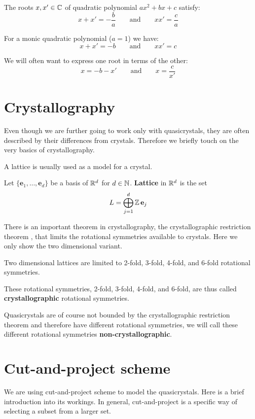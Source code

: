 \documentclass[text.tex]{subfiles}
\begin{document}
The roots $x,x'\in\mathbb{C}$ of quadratic polynomial $ax^2+bx+c$ satisfy: 
$$x+x'=-\frac{b}{a}\qquad\text{and}\qquad xx'=\frac{c}{a}$$

For a monic quadratic polynomial ($a=1$) we have:
$$x+x'=-b\qquad\text{and}\qquad xx'=c$$

We will often want to express one root in terms of the other: 
$$x=-b-x'\qquad\text{and}\qquad x=\frac{c}{x'}$$


\section{Crystallography}\label{sec_crystallography}%
Even though we are further going to work only with quasicrystals, they are often described by their differences from crystals. Therefore we briefly touch on the very basics of crystallography. 

A lattice is usually used as a model for a crystal. 

\begin{definition}
Let $\{\mathbf{e}_1, \dots, \mathbf{e}_d\}$ be a basis of $\mathbb{R}^d$ for $d\in\mathbb{N}$. \textbf{Lattice} in $\mathbb{R}^d$ is the set
$$L = \bigoplus^d_{j=1}\mathbb{Z}\, \mathbf{e}_j$$
\end{definition}

There is an important theorem in crystallography, the crystallographic restriction theorem \cite{restriction}, that limits the rotational symmetries available to crystals. Here we only show the two dimensional variant. 

\begin{theorem}
Two dimensional lattices are limited to 2-fold, 3-fold, 4-fold, and 6-fold rotational symmetries. 
\end{theorem}

These rotational symmetries, 2-fold, 3-fold, 4-fold, and 6-fold, are thus called \textbf{crystallographic} rotational symmetries. 

Quasicrystals are of course not bounded by the crystallographic restriction theorem and therefore have different rotational symmetries, we will call these different rotational symmetries \textbf{non-crystallographic}.

\section{Cut-and-project scheme}\label{sec_cutAndProject}%
We are using cut-and-project scheme to model the quasicrystals. Here is a brief introduction into its workings. In general, cut-and-project is a specific way of selecting a subset from a larger set.
\end{document}
